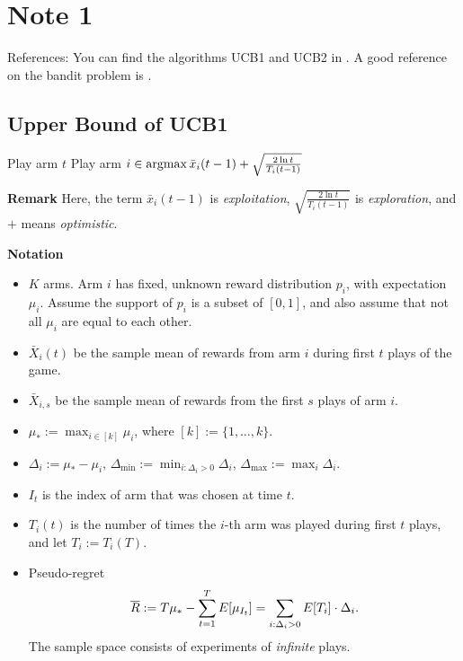 \section{Note 1}

References: You can find the algorithms UCB1 and UCB2 in \cite{Auer2002}.
A good reference on the bandit problem is \cite{MAL024}.

\subsection{Upper Bound of UCB1} %

\begin{alg}[UCB1] \leavevmode
    \begin{framed}
        \begin{algorithmic}
                \State Play arm $t$
            \EndFor
                \State Play arm $i\in\mathop{\mathrm{argmax}} \bar x_{i}(t-1) + \sqrt{\frac{2\ln t}{T_i(t-1)}}$
            \EndFor
        \end{algorithmic}
    \end{framed}
\end{alg}

\textbf{Remark}
Here,
the term $\bar x_{i}(t-1)$ is \emph{exploitation},
$\sqrt{\frac{2\ln t}{T_i(t-1)}}$ is \emph{exploration},
and $+$ means \emph{optimistic}.

\textbf{Notation}
\begin{itemize}
    \item $K$ arms.
        Arm $i$ has fixed, unknown reward distribution $p_i$,
        with expectation $\mu_i$.
        Assume the support of $p_i$ is a subset of $[0,1]$, and
        also assume that not all $\mu_i$ are equal to each other.
    \item $\bar X_{i}(t)$ be the sample mean of rewards from arm $i$ during first $t$ plays of the game.
    \item $\bar X_{i,s}$ be the sample mean of rewards from the first $s$ plays of arm $i$.
    \item $\mu_*:=\max_{i\in[k]}\mu_i$, where $[k]:=\{1,\dots,k\}$.
    \item $\Delta_i:=\mu_* - \mu_i$,
        $\Delta_{\text{min}}:=\min_{i:\Delta_i>0}\Delta_i$,
        $\Delta_{\text{max}}:=\max_i \Delta_i$.
    \item $I_t$ is the index of arm that was chosen at time $t$.
    \item $T_i(t)$ is the number of times the $i$-th arm was played during first $t$ plays,
        and let $T_i:=T_i(T)$.
    \item Pseudo-regret
        \begin{equation}
            {\overline{R}}:=T\mu_*-\sum_{t=1}^T E[\mu_{I_t}]
            = \sum_{i:\Delta_i>0} E[T_i]\cdot\Delta_i.
        \end{equation}
        The sample space consists of experiments of \emph{infinite} plays.
\end{itemize}
\

